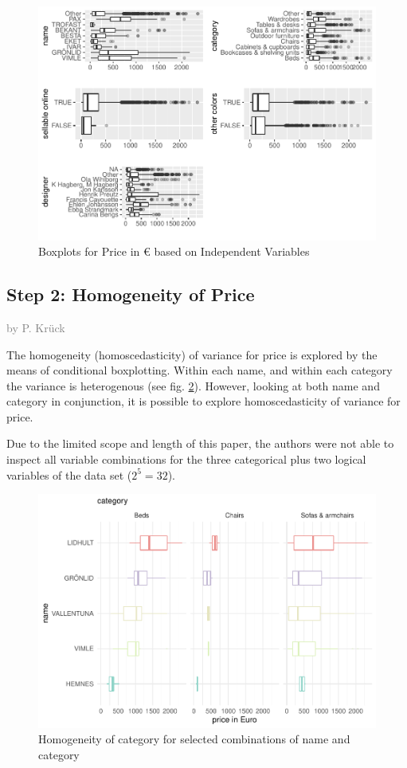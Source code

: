 \documentclass[a4paper, nobind]{templates/ociamthesis}
\begin{document}
\begin{figure}
\includegraphics[width=1\linewidth]{_main_files/figure-latex/outliers-1} \caption{Boxplots for Price in € based on Independent Variables}\label{fig:outliers}
\end{figure}

\hypertarget{step-2-homogeneity-of-price}{%
\subsection{Step 2: Homogeneity of Price}\label{step-2-homogeneity-of-price}}

\textcolor{gray}{by P. Krück}

The homogeneity (homoscedasticity) of variance for price is explored by the means of conditional boxplotting.
Within each name, and within each category the variance is heterogenous (see fig. \ref{fig:homogeneity}). However, looking at both name and category in conjunction, it is possible to explore homoscedasticity of variance for price.

Due to the limited scope and length of this paper, the authors were not able to inspect all variable combinations for the three categorical plus two logical variables of the data set (\(2^5=32\)).

\begin{figure}
\includegraphics[width=1\linewidth]{_main_files/figure-latex/homogeneity-1} \caption{Homogeneity of category for selected combinations of name and category}\label{fig:homogeneity}
\end{figure}
\end{document}
